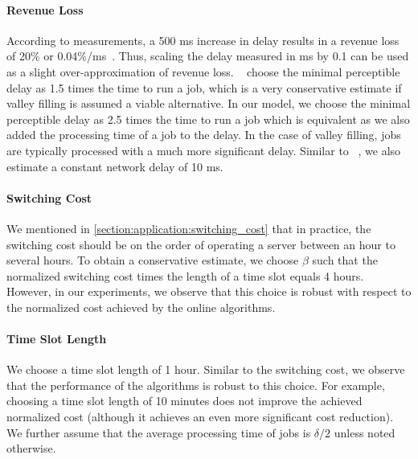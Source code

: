 \paragraph{Revenue Loss} According to measurements, a 500 ms increase in delay results in a revenue loss of 20\% or 0.04\%/ms~\cite{Lin2012, Hamilton2009}. Thus, scaling the delay measured in ms by 0.1 can be used as a slight over-approximation of revenue loss. \citeauthor*{Lin2011}~\cite{Lin2011} choose the minimal perceptible delay as 1.5 times the time to run a job, which is a very conservative estimate if valley filling is assumed a viable alternative. In our model, we choose the minimal perceptible delay as 2.5 times the time to run a job which is equivalent as we also added the processing time of a job to the delay. In the case of valley filling, jobs are typically processed with a much more significant delay. Similar to \citeauthor*{Lin2012}~\cite{Lin2012}, we also estimate a constant network delay of 10 ms.

\paragraph{Switching Cost} We mentioned in \cref{section:application:switching_cost} that in practice, the switching cost should be on the order of operating a server between an hour to several hours. To obtain a conservative estimate, we choose $\beta$ such that the normalized switching cost times the length of a time slot equals 4 hours. However, in our experiments, we observe that this choice is robust with respect to the normalized cost achieved by the online algorithms.

\paragraph{Time Slot Length} We choose a time slot length of 1 hour. Similar to the switching cost, we observe that the performance of the algorithms is robust to this choice. For example, choosing a time slot length of 10 minutes does not improve the achieved normalized cost (although it achieves an even more significant cost reduction). We further assume that the average processing time of jobs is $\delta / 2$ unless noted otherwise.

